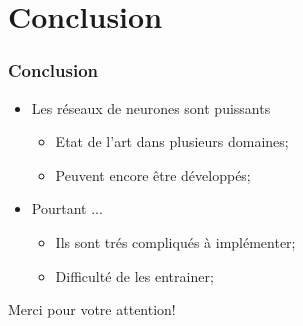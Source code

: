 \section{Conclusion}

\begin{frame}
\frametitle{Conclusion}

\begin{itemize}
    \item<1->    Les réseaux de neurones sont puissants
    \begin{itemize}
        \item<1->    Etat de l'art dans plusieurs domaines;
        \item<1->    Peuvent encore être développés;
    \end{itemize}
    
    \item<1->    Pourtant ...
    \begin{itemize}
        \item<1->    Ils sont trés compliqués à implémenter;
        \item<1->    Difficulté de les entrainer;
    \end{itemize}
\end{itemize}
\end{frame}

\begin{frame}

\begin{center}
{\fontsize{100}{100}\selectfont Merci pour votre attention!}
\end{center}

\end{frame}